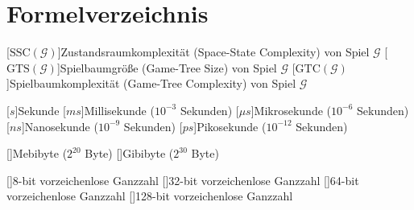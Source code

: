 \chapter*{Formelverzeichnis}

\DeclareSIUnit{}

\newcommand{\acrounit}[1]{
    \acroextra{\makebox[13mm][l]{\si[per-mode=fraction,fraction-function=\sfrac]{#1}}}
}
\def\acrospace{\acroextra{\makebox[14.375mm][l]{}}}


\begin{acronym}[WYSISWG] %


    [\ensuremath{\text{SSC}(\mathcal{G})}]{Zustandsraumkomplexität (Space-State Complexity) von Spiel $\mathcal{G}$}
    [\ensuremath{\text{GTS}(\mathcal{G})}]{Spielbaumgröße (Game-Tree Size) von Spiel $\mathcal{G}$}
    [\ensuremath{\text{GTC}(\mathcal{G})}]{Spielbaumkomplexität (Game-Tree Complexity) von Spiel $\mathcal{G}$}

    \vspace{1.2cm}

    [\ensuremath{s}]{Sekunde}
    [\ensuremath{ms}]{Millisekunde ($10^{-3}$ Sekunden)}
    [\ensuremath{\mu{}s}]{Mikrosekunde ($10^{-6}$ Sekunden)}
    [\ensuremath{ns}]{Nanosekunde ($10^{-9}$ Sekunden)}
    [\ensuremath{ps}]{Pikosekunde ($10^{-12}$ Sekunden)}

    \vspace{1.2cm}

    []{Mebibyte ($2^{20}$ Byte)}
    []{Gibibyte ($2^{30}$ Byte)}

    \vspace{1.2cm}

    []{8-bit vorzeichenlose Ganzzahl}
    []{32-bit vorzeichenlose Ganzzahl}
    []{64-bit vorzeichenlose Ganzzahl}
    []{128-bit vorzeichenlose Ganzzahl}


\end{acronym}
